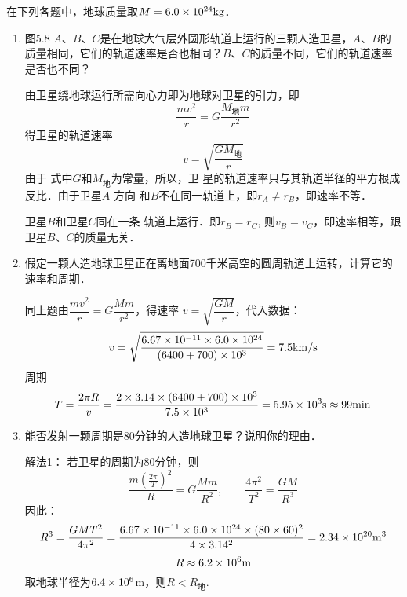 在下列各题中，地球质量取$M=6.0\times 10^{24}{\rm kg}$．
\begin{enumerate}
	\item 图5.8 $A$、$B$、$C$是在地球大气层外圆形轨道上运行的三颗人造卫星，$A$、$B$的质量相同，它们的轨道速率是否也相同？$B$、$C$的质量不同，它们的轨道速率是否也不同？

\begin{figure}[htp]
\centering{}
\caption{}
\end{figure}


\begin{solution}
	由卫星绕地球运行所需向心力即为地球对卫星的引力，即
\[\frac{mv^2}{r}=G\frac{M_{\text{地}}m}{r^2}\]
得卫星的轨道速率
\[v=\sqrt{\frac{GM_{\text{地}}}{r}}\]
由于
式中$G$和$M_{\text{地}}$为常量，所以，卫
星的轨道速率只与其轨道半径的平方根成反比．由于卫星$A$
方向
和$B$不在同一轨道上，即$r_A\ne r_B$，即速率不等．

卫星$B$和卫星$C$同在一条
轨道上运行．即$r_B=r_C$, 则$v_B=v_C$，即速率相等，跟卫星$B$、$C$的质量无关．
\end{solution}


\item  假定一颗人造地球卫星正在离地面700千米高空的圆周轨道上运转，计算它的速率和周期．

\begin{solution}
	同上题由$\dfrac{mv^2}{r}=G\dfrac{Mm}{r^2}$，得速率
$v=\sqrt{\dfrac{GM}{r}}$，代入数据：
\[v=\sqrt{\frac{6.67\times 10^{-11}\times 6.0\times 10^{24}}{(6400+700)\times 10^3}}=7.5{\rm km/s}\]
周期
\[T=\frac{2\pi R}{v}=\frac{2\times 3.14\times (6400+700)\times 10^3}{7.5\times 10^3}=5.95\times 10^3{\rm s}\approx 99{\rm min}\]
\end{solution}

\item 能否发射一颗周期是80分钟的人造地球卫星？说明你的理由．

\begin{solution}
	解法1：
	若卫星的周期为80分钟，则
\[\frac{m\left(\frac{2\pi}{T}\right)^2}{R}=G\frac{Mm}{R^2},\qquad \frac{4\pi^2}{T^2}=\frac{GM}{R^3}\]
因此：
\[R^3=\frac{GMT^2}{4\pi^2}=\frac{6.67\times 10^{-11}\times 6.0\times 10^{24}\times (80\times 60)^2}{4\times 3.14^2}=2.34\times 10^{20}{\rm m^3}\]
\[R\approx 6.2\times 10^{6}{\rm m}\]
取地球半径为$6.4\times10^6$m，则$R<R_{\text{地}}$.


\end{solution}
\end{enumerate}
